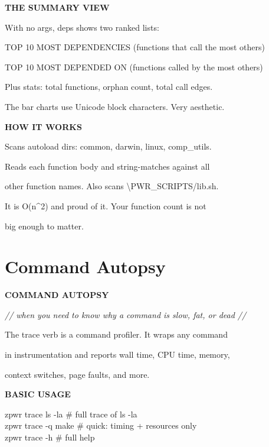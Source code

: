 \documentclass[11pt,a4paper,twoside]{book}
\begin{document}
\vspace{12pt}
{\bfseries\color{neonyellow} THE SUMMARY VIEW}\vspace{4pt}

With no args, deps shows two ranked lists:

TOP 10 MOST DEPENDENCIES (functions that call the most others)

TOP 10 MOST DEPENDED ON  (functions called by the most others)

Plus stats: total functions, orphan count, total call edges.

The bar charts use Unicode block characters. Very aesthetic.


\vspace{12pt}
{\bfseries\color{neonyellow} HOW IT WORKS}\vspace{4pt}

Scans autoload dirs: common, darwin, linux, comp\_utils.

Reads each function body and string-matches against all

other function names. Also scans \textbackslash{}PWR\_SCRIPTS/lib.sh.

It is O(n\textasciicircum{}2) and proud of it. Your function count is not

big enough to matter.


\vspace{16pt}

\section{Command Autopsy}


\vspace{10pt}
{\large\bfseries\color{neoncyan} COMMAND AUTOPSY}\vspace{6pt}

{\small\itshape\color{dimtext} // when you need to know why a command is slow, fat, or dead //}

The trace verb is a command profiler. It wraps any command

in instrumentation and reports wall time, CPU time, memory,

context switches, page faults, and more.


\vspace{12pt}
{\bfseries\color{neonyellow} BASIC USAGE}\vspace{4pt}

\begin{codebox}
zpwr trace ls -la                   \# full trace of ls -la\\
zpwr trace -q make                  \# quick: timing + resources only\\
zpwr trace -h                       \# full help\\
\end{codebox}
\end{document}

